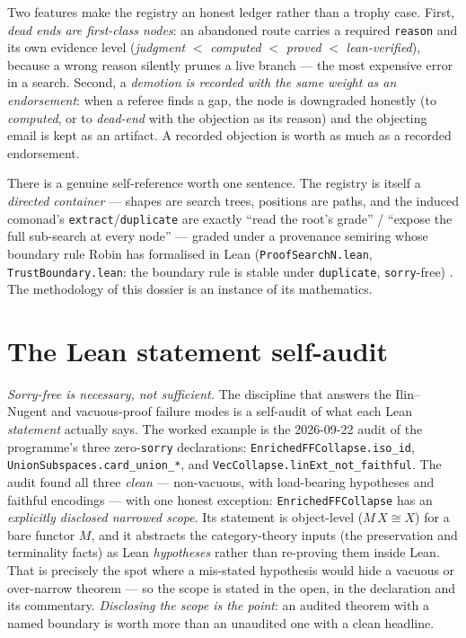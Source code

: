 \documentclass[11pt]{report}
\theoremstyle{plain}
\theoremstyle{definition}
\theoremstyle{remark}
\begin{document}
Two features make the registry an honest ledger rather than a trophy case. First,
\emph{dead ends are first-class nodes}: an abandoned route carries a required
\texttt{reason} and its own evidence level (\emph{judgment} $<$ \emph{computed}
$<$ \emph{proved} $<$ \emph{lean-verified}), because a wrong reason silently
prunes a live branch --- the most expensive error in a search. Second, a
\emph{demotion is recorded with the same weight as an endorsement}: when a referee
finds a gap, the node is downgraded honestly (to \emph{computed}, or to
\emph{dead-end} with the objection as its reason) and the objecting email is kept
as an artifact. A recorded objection is worth as much as a recorded endorsement.

There is a genuine self-reference worth one sentence. The registry is itself a
\emph{directed container} --- shapes are search trees, positions are paths, and
the induced comonad's \texttt{extract}/\texttt{duplicate} are exactly ``read the
root's grade'' / ``expose the full sub-search at every node'' --- graded under a
provenance semiring whose boundary rule Robin has formalised in Lean
(\texttt{ProofSearchN.lean}, \texttt{TrustBoundary.lean}: the boundary rule is
stable under \texttt{duplicate}, \texttt{sorry}-free) \cite{langer-proofsearch}.
The methodology of this dossier is an instance of its mathematics.

\section{The Lean statement self-audit}\label{sec:pipeline-audit}

\emph{Sorry-free is necessary, not sufficient.} The discipline that answers the
Ilin--Nugent and vacuous-proof failure modes is a self-audit of what each Lean
\emph{statement} actually says. The worked example is the 2026-09-22 audit of the
programme's three zero-\texttt{sorry} declarations:
\texttt{EnrichedFFCollapse.iso\_id}, \texttt{UnionSubspaces.card\_union\_*}, and
\texttt{VecCollapse.linExt\_not\_faithful}. The audit found all three
\emph{clean} --- non-vacuous, with load-bearing hypotheses and faithful
encodings --- with one honest exception: \texttt{EnrichedFFCollapse} has an
\emph{explicitly disclosed narrowed scope}. Its statement is object-level
($M\,X\cong X$) for a bare functor $M$, and it abstracts the category-theory
inputs (the preservation and terminality facts) as Lean \emph{hypotheses} rather
than re-proving them inside Lean. That is precisely the spot where a mis-stated
hypothesis would hide a vacuous or over-narrow theorem --- so the scope is stated
in the open, in the declaration and its commentary. \emph{Disclosing the scope is
the point}: an audited theorem with a named boundary is worth more than an
unaudited one with a clean headline.
\end{document}
